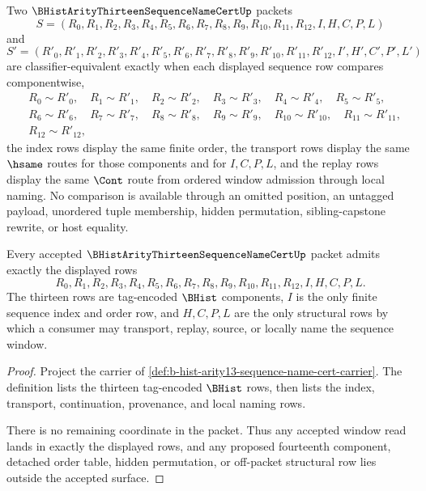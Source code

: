 \begin{definition}
\label{def:b-hist-arity13-sequence-name-cert-classifier}
Two $\BHistArityThirteenSequenceNameCertUp$ packets
$$
S=(R_0,R_1,R_2,R_3,R_4,R_5,R_6,R_7,R_8,R_9,R_{10},R_{11},R_{12},I,H,C,P,L)
$$
and
$$
S'=(R'_0,R'_1,R'_2,R'_3,R'_4,R'_5,R'_6,R'_7,R'_8,R'_9,R'_{10},R'_{11},R'_{12},I',H',C',P',L')
$$
are classifier-equivalent exactly when each displayed sequence row compares componentwise,
$$
\begin{aligned}
&R_0 \sim R'_0,\quad R_1 \sim R'_1,\quad R_2 \sim R'_2,\quad R_3 \sim R'_3,\quad R_4 \sim R'_4,\quad R_5 \sim R'_5,\\
&R_6 \sim R'_6,\quad R_7 \sim R'_7,\quad R_8 \sim R'_8,\quad R_9 \sim R'_9,\quad R_{10} \sim R'_{10},\quad R_{11} \sim R'_{11},\\
&R_{12} \sim R'_{12},
\end{aligned}
$$
the index rows display the same finite order, the transport rows display the same $\hsame$ routes for those components and for $I,C,P,L$, and the replay rows display the same $\Cont$ route from ordered window admission through local naming. No comparison is available through an omitted position, an untagged payload, unordered tuple membership, hidden permutation, sibling-capstone rewrite, or host equality.
\end{definition}

\begin{theorem}
\label{thm:b-hist-arity13-sequence-name-cert-carrier-admission}
Every accepted $\BHistArityThirteenSequenceNameCertUp$ packet admits exactly the displayed rows
$$
R_0,R_1,R_2,R_3,R_4,R_5,R_6,R_7,R_8,R_9,R_{10},R_{11},R_{12},I,H,C,P,L.
$$
The thirteen rows are tag-encoded $\BHist$ components, $I$ is the only finite sequence index and order row, and $H,C,P,L$ are the only structural rows by which a consumer may transport, replay, source, or locally name the sequence window.
\end{theorem}
\begin{proof}
Project the carrier of \autoref{def:b-hist-arity13-sequence-name-cert-carrier}. The definition lists the thirteen tag-encoded $\BHist$ rows, then lists the index, transport, continuation, provenance, and local naming rows.

There is no remaining coordinate in the packet. Thus any accepted window read lands in exactly the displayed rows, and any proposed fourteenth component, detached order table, hidden permutation, or off-packet structural row lies outside the accepted surface.
\end{proof}


